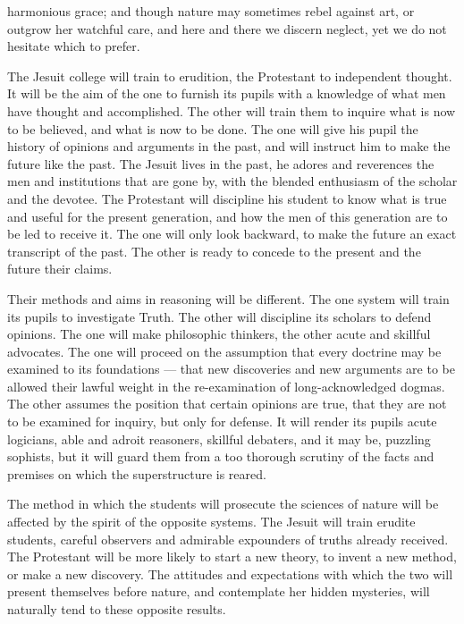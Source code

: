 \documentclass[]{book}
\begin{document}
harmonious grace; and though nature may sometimes rebel against art, or outgrow her watchful care, and here and there we discern neglect, yet we do not hesitate which to prefer.

The Jesuit college will train to erudition, the Protestant to independent thought. It will be the aim of the one to furnish its pupils with a knowledge of what men have thought and accomplished. The other will train them to inquire what is now to be believed, and what is now to be done. The one will give his pupil the history of opinions and arguments in the past, and will instruct him to make the future like the past. The Jesuit lives in the past, he adores and reverences the men and institutions that are gone by, with the blended enthusiasm of the scholar and the devotee. The Protestant will discipline his student to know what is true and useful for the present generation, and how the men of this generation are to be led to receive it. The one will only look backward, to make the future an exact transcript of the past. The other is ready to concede to the present and the future their claims.

Their methods and aims in reasoning will be different. The one system will train its pupils to investigate Truth. The other will discipline its scholars to defend opinions. The one will make philosophic thinkers, the other acute and skillful advocates. The one will proceed on the assumption that every doctrine may be examined to its foundations --- that new discoveries and new arguments are to be allowed their lawful weight in the re-examination of long-acknowledged dogmas. The other assumes the position that certain opinions are true, that they are not to be examined for inquiry, but only for defense. It will render its pupils acute logicians, able and adroit reasoners, skillful debaters, and it may be, puzzling sophists, but it will guard them from a too thorough scrutiny of the facts and premises on which the superstructure is reared.

The method in which the students will prosecute the sciences of nature will be affected by the spirit of the opposite systems. The Jesuit will train erudite students, careful observers and admirable expounders of truths already received. The Protestant will be more likely to start a new theory, to invent a new method, or make a new discovery. The attitudes and expectations with which the two will present themselves before nature, and contemplate her hidden mysteries, will naturally tend to these opposite results.
\end{document}
